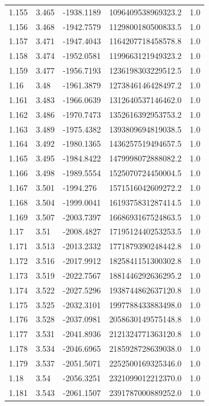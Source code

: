\begin{tabular}{lllll}
1.155 & 3.465 & -1938.1189 & 1096409538969323.2 & 1.0 \\
1.156 & 3.468 & -1942.7579 & 1129800180500833.5 & 1.0 \\
1.157 & 3.471 & -1947.4043 & 1164207718458578.8 & 1.0 \\
1.158 & 3.474 & -1952.0581 & 1199663121949323.2 & 1.0 \\
1.159 & 3.477 & -1956.7193 & 1236198303229512.5 & 1.0 \\
1.16 & 3.48 & -1961.3879 & 1273846146428497.2 & 1.0 \\
1.161 & 3.483 & -1966.0639 & 1312640537146462.0 & 1.0 \\
1.162 & 3.486 & -1970.7473 & 1352616392953753.2 & 1.0 \\
1.163 & 3.489 & -1975.4382 & 1393809694819038.5 & 1.0 \\
1.164 & 3.492 & -1980.1365 & 1436257519494657.5 & 1.0 \\
1.165 & 3.495 & -1984.8422 & 1479998072888082.2 & 1.0 \\
1.166 & 3.498 & -1989.5554 & 1525070724450004.5 & 1.0 \\
1.167 & 3.501 & -1994.276 & 1571516042609272.2 & 1.0 \\
1.168 & 3.504 & -1999.0041 & 1619375831287414.5 & 1.0 \\
1.169 & 3.507 & -2003.7397 & 1668693167524863.5 & 1.0 \\
1.17 & 3.51 & -2008.4827 & 1719512440253253.5 & 1.0 \\
1.171 & 3.513 & -2013.2332 & 1771879390248442.8 & 1.0 \\
1.172 & 3.516 & -2017.9912 & 1825841151300302.8 & 1.0 \\
1.173 & 3.519 & -2022.7567 & 1881446292636295.2 & 1.0 \\
1.174 & 3.522 & -2027.5296 & 1938744862637120.8 & 1.0 \\
1.175 & 3.525 & -2032.3101 & 1997788433883498.0 & 1.0 \\
1.176 & 3.528 & -2037.0981 & 2058630149575148.8 & 1.0 \\
1.177 & 3.531 & -2041.8936 & 2121324771363120.8 & 1.0 \\
1.178 & 3.534 & -2046.6965 & 2185928728639038.0 & 1.0 \\
1.179 & 3.537 & -2051.5071 & 2252500169325346.0 & 1.0 \\
1.18 & 3.54 & -2056.3251 & 2321099012212370.0 & 1.0 \\
1.181 & 3.543 & -2061.1507 & 2391787000889252.0 & 1.0 \\

\end{tabular}
